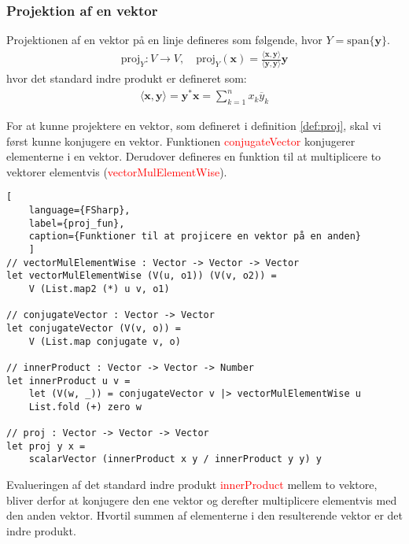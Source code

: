 \subsubsection{Projektion af en vektor}

\begin{definition}\label{def:proj}
Projektionen af en vektor på en linje defineres som følgende, hvor $Y = \text{span}\{\mathbf{y}\}$.
\begin{align}
    \text{proj}_Y : V \rightarrow V, \quad \text{proj}_Y(\mathbf{x}) = \frac{\langle \mathbf{x}, \mathbf{y} \rangle}{\langle \mathbf{y}, \mathbf{y} \rangle} \mathbf{y}
\end{align}
hvor det standard indre produkt er defineret som:
\begin{align}
    \langle \mathbf{x}, \mathbf{y} \rangle = \mathbf{y}^* \mathbf{x} = \sum_{k=1}^{n} x_k \overline{y}_k
\end{align}
\end{definition}

    

For at kunne projektere en vektor, som defineret i definition \ref{def:proj}, skal vi først kunne konjugere en vektor. Funktionen \textcolor{red}{conjugateVector} konjugerer elementerne i en vektor. Derudover defineres en funktion til at multiplicere to vektorer elementvis (\textcolor{red}{vectorMulElementWise}).

\begin{lstlisting}[
    language={FSharp}, 
    label={proj_fun}, 
    caption={Funktioner til at projicere en vektor på en anden}
    ]
// vectorMulElementWise : Vector -> Vector -> Vector
let vectorMulElementWise (V(u, o1)) (V(v, o2)) =
    V (List.map2 (*) u v, o1)

// conjugateVector : Vector -> Vector
let conjugateVector (V(v, o)) = 
    V (List.map conjugate v, o)

// innerProduct : Vector -> Vector -> Number
let innerProduct u v =
    let (V(w, _)) = conjugateVector v |> vectorMulElementWise u
    List.fold (+) zero w

// proj : Vector -> Vector -> Vector   
let proj y x =
    scalarVector (innerProduct x y / innerProduct y y) y
\end{lstlisting}

Evalueringen af det standard indre produkt \textcolor{red}{innerProduct} mellem to vektore, bliver derfor at konjugere den ene vektor og derefter multiplicere elementvis med den anden vektor. Hvortil summen af elementerne i den resulterende vektor er det indre produkt.

